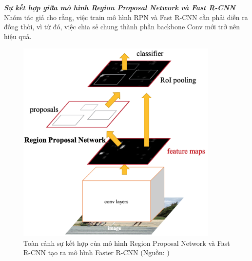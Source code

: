 {    \noindent
    \textbf{\textit{Sự kết hợp giữa mô hình Region Proposal Network và Fast R-CNN}} \\
    Nhóm tác giả cho rằng, việc train mô hình RPN và Fast R-CNN cần phải diễn ra đồng thời, vì từ đó, việc chia sẻ chung thành phần backbone Conv mới trở nên hiệu quả.

    \begin{figure}[H]
        \centering
        \includegraphics[width=10cm] {images/faster_rcnn_model}
        \caption{Toàn cảnh sự kết hợp của mô hình Region Proposal Network và Fast R-CNN tạo ra mô hình Faster R-CNN (Nguồn: \cite{ren2015faster})}
        \label{fig:faster_model}
    \end{figure}

}
